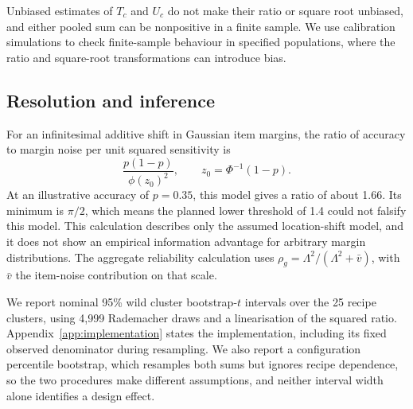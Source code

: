 \documentclass{article}
\newcommand{\Lam}{\Lambda}
\begin{document}
Unbiased estimates of $T_c$ and $U_c$ do not make their ratio or square root unbiased, and either pooled sum can be nonpositive in a finite sample. We use calibration simulations to check finite-sample behaviour in specified populations, where the ratio and square-root transformations can introduce bias.

\subsection{Resolution and inference}
For an infinitesimal additive shift in Gaussian item margins, the ratio of accuracy to margin noise per unit squared sensitivity is
\begin{equation}
\frac{p(1-p)}{\phi(z_0)^2},\qquad z_0=\Phi^{-1}(1-p).
\label{eq:information}
\end{equation}
At an illustrative accuracy of $p=0.35$, this model gives a ratio of about 1.66. Its minimum is $\pi/2$, which means the planned lower threshold of 1.4 could not falsify this model. This calculation describes only the assumed location-shift model, and it does not show an empirical information advantage for arbitrary margin distributions. The aggregate reliability calculation uses $\rho_g=\Lam^2/(\Lam^2+\bar v)$, with $\bar v$ the item-noise contribution on that scale.

We report nominal 95\% wild cluster bootstrap-$t$ intervals over the 25 recipe clusters, using 4,999 Rademacher draws and a linearisation of the squared ratio. Appendix~\ref{app:implementation} states the implementation, including its fixed observed denominator during resampling. We also report a configuration percentile bootstrap, which resamples both sums but ignores recipe dependence, so the two procedures make different assumptions, and neither interval width alone identifies a design effect.
\end{document}
